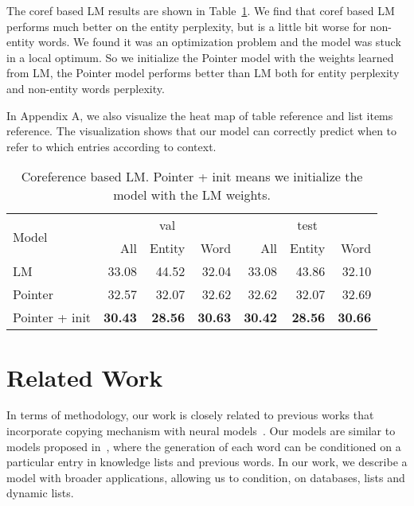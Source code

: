 \documentclass[11pt,letterpaper]{article}
\begin{document}
The coref based LM results are shown in Table~\ref{tab:coref_lm}. We find that coref
based LM performs much better on the entity perplexity, but is a little
bit worse for non-entity words. We found it was an optimization problem and the
model was stuck in a local optimum. So we initialize the Pointer model with the
weights learned from LM, the Pointer model performs better than LM both for
entity perplexity and non-entity words perplexity.

In Appendix A, we also visualize the heat map of table reference and list items
reference. The visualization shows that our model can correctly predict when to
refer to which entries according to context.

\begin{table}[!ht]
\centering
\begin{small}
\begin{tabular}{l r r r | r r r}
  \toprule
  \multirow{2}{*}{Model} & \multicolumn{3}{c}{val} &  \multicolumn{3}{c}{test} \\
                         & All & Entity & Word & All & Entity & Word \\
  \hline
  LM & 33.08 & 44.52 & 32.04 & 33.08 & 43.86 & 32.10 \\
  Pointer & 32.57 & 32.07 & 32.62 & 32.62 & 32.07 & 32.69 \\
  \parbox{1cm}{Pointer + init} & {\bf 30.43} & {\bf 28.56} & {\bf 30.63}
                               & {\bf 30.42} & {\bf 28.56} & {\bf 30.66} \\ \bottomrule
\end{tabular}
\caption{Coreference based LM. Pointer + init means we initialize the model
  with the LM weights.}
\label{tab:coref_lm}
\end{small}
  \vspace{-0.5cm}
\end{table}







\section{Related Work}

In terms of methodology, our work is closely related to previous works that
incorporate copying mechanism with neural
models~\citep{GulcehreANZB16,GuLLL16,ling:2016,ptrnets}. Our models are similar
to models proposed in~\citep{ahn:2016, merity2016pointer}, where the generation
of each word can be conditioned on a particular entry in knowledge lists and
previous words. In our work, we describe a model with broader applications,
allowing us to condition, on databases, lists and dynamic lists.
\end{document}
